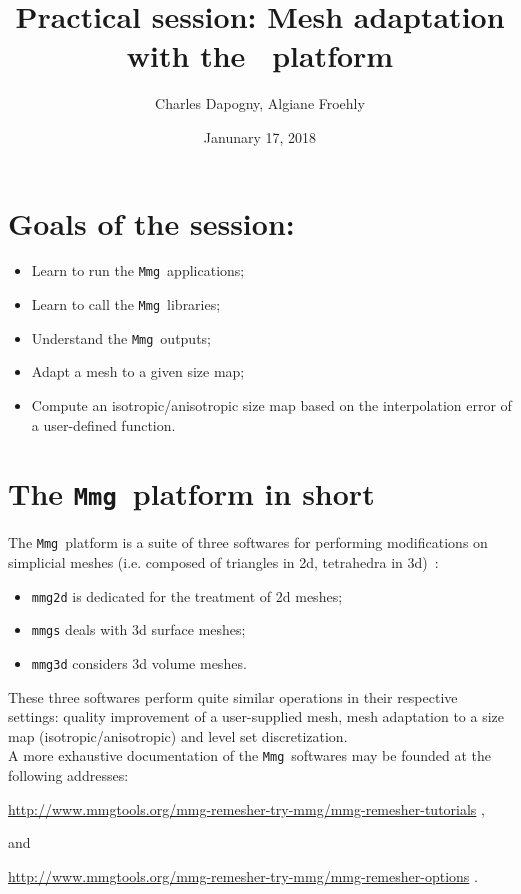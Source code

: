 \documentclass{article}
\author{Charles Dapogny, Algiane Froehly}
\date{Janunary 17, 2018}
\title{Practical session: Mesh adaptation with the \mmg\ platform}
\newcommand{\mmg}{\texttt{Mmg}}
\begin{document}
\maketitle

\date{}

\section{Goals of the session:}
\begin{itemize}
\item Learn to run the \mmg\ applications;
\item Learn to call the \mmg\ libraries;
\item Understand the \mmg\ outputs;
\item Adapt a mesh to a given size map;
\item Compute an isotropic/anisotropic size map based on the interpolation error of a user-defined function.
\end{itemize}

\section{The \mmg\ platform in short}

The \mmg\ platform is a suite of three softwares for performing modifications on simplicial meshes (i.e. composed of triangles in 2d, tetrahedra in 3d)~:
\begin{itemize}
\item \texttt{mmg2d} is dedicated for the treatment of 2d meshes;
\item \texttt{mmgs} deals with 3d surface meshes;
\item \texttt{mmg3d} considers 3d volume meshes.
\end{itemize}
These three softwares perform quite similar operations in their respective settings:  
quality improvement of a user-supplied mesh, mesh adaptation to a size
map (isotropic/anisotropic) and level set discretization.\\

A more exhaustive documentation of the \mmg\ softwares may be founded at the following addresses:
\begin{center}
\url{http://www.mmgtools.org/mmg-remesher-try-mmg/mmg-remesher-tutorials} ,  
\end{center}
and 
\begin{center}
\url{http://www.mmgtools.org/mmg-remesher-try-mmg/mmg-remesher-options} . 
\end{center}
\end{document}
